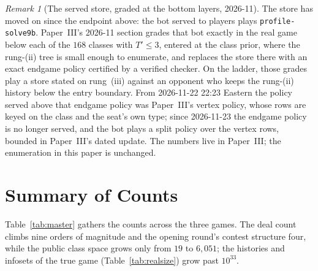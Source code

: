 \documentclass[11pt]{article}
\theoremstyle{plain}
\theoremstyle{definition}
\theoremstyle{remark}
\newtheorem{remark}[theorem]{Remark}
\newcommand{\code}[1]{\texttt{\small #1}}
\begin{document}
\begin{remark}[The served store, graded at the bottom layers, 2026-11]
\label{rem:frontiergraded}
The store has moved on since the endpoint above: the bot served to
players plays \code{profile-solve9b}. Paper~III's 2026-11 section grades
that bot exactly in the real game below each of the $168$ classes with
$T'\le3$, entered at the class prior, where the rung-(ii) tree is small
enough to enumerate, and replaces the store there with an exact endgame
policy certified by a verified checker. On the ladder, those grades play
a store stated on rung~(iii) against an opponent who keeps the rung-(ii)
history below the entry boundary. From 2026-11-22 22:23 Eastern the
policy served above that endgame policy was Paper~III's vertex policy,
whose rows are keyed on the class and the seat's own type; since
2026-11-23 the endgame policy is no longer served, and the bot plays a
split policy over the vertex rows, bounded in Paper~III's dated update. The numbers live in
Paper~III; the enumeration in this paper is unchanged.
\end{remark}

\section{Summary of Counts}\label{sec:summary}

Table~\ref{tab:master} gathers the counts across the three games. The deal
count climbs nine orders of magnitude and the opening round's contest
structure four, while the public class space grows only from $19$ to
$6{,}051$; the histories and infosets of the true game
(Table~\ref{tab:realsize}) grow past $10^{33}$.
\end{document}
